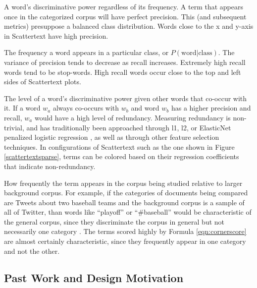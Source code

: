 \documentclass[11pt,a4paper]{article}
\begin{document}
\begin{description}[style=unboxed,leftmargin=0cm]
\item[Precision] A word's discriminative power regardless of its frequency.  A term that appears once in the categorized corpus will have perfect precision. This (and subsequent metrics) presuppose a balanced class distribution.  Words close to the x and y-axis in Scattertext have high precision.  \vspace{-0.1in}
\item[Recall] The frequency a word appears in a particular class, or $P(\mbox{word}|\mbox{class})$.  The variance of precision tends to decrease as recall increases.  Extremely high recall words tend to be stop-words.  High recall words occur close to the top and left sides of Scattertext plots.  \vspace{-0.1in}
\item[Non-redundancy] The level of a word's discriminative power given other words that co-occur with it.  If a word $w_a$ always co-occurs with $w_b$ and word $w_b$ has a higher precision and recall, $w_a$ would have a high level of redundancy. Measuring redundancy is non-trivial, and has traditionally been approached through l1, l2, or ElasticNet penalized logistic regression \cite{joshi2010}, as well as through other feature selection techniques.  In configurations of Scattertext such as the one shown in Figure \ref{scattertextsparse}, terms can be colored based on their regression coefficients that indicate non-redundancy.  \vspace{-0.1in}

\item[Characteristicness] How frequently the term appears in the corpus being studied relative to larger background corpus.  For example, if the categories of documents being compared are Tweets about two baseball teams and the background corpus is a sample of all of Twitter, than words like ``playoff'' or ``\#baseball'' would be characteristic of the general corpus, since they discriminate the corpus in general but not necessarily one category \cite{vennclouds}.  The terms scored highly by Formula \ref{eqn:cornerscore} are almost certainly characteristic, since they frequently appear in one category and not the other.  \vspace{-0.1in}
\end{description}

\subsection{Past Work and Design Motivation}
\end{document}
